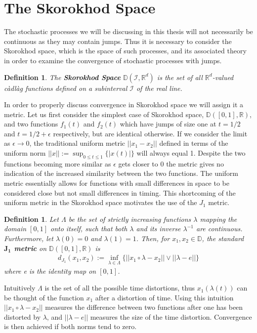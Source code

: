 \documentclass[honours,12pt,twoside, openright]{unswthesis}
\newcommand{\R}{\mathbb{R}}
\newcommand{\1}{\mathbf 1}
\newcommand{\D}{\mathbb{D}}
\newtheorem{definition}[equation]{Definition}
\numberwithin{equation}{section}
\theoremstyle{definition}
\theoremstyle{remark}
\begin{document}
\section{The Skorokhod Space}
The stochastic processes we will be discussing in this thesis will not necessarily be continuous as they may contain jumps. Thus it is necessary to consider the Skorokhod space, which is the space of such processes, and its associated theory in order to examine the convergence of stochastic processes with jumps.\\
\begin{definition}
	The \textbf{Skorokhod Space} $\D(\mathcal{I},\R^d)$ is the set of all $\R^d$-valued c\`{a}dl\`{a}g functions defined on a subinterval $\mathcal{I}$ of the real line.\\
\end{definition}

\noindent In order to properly discuss convergence in Skorokhod space we will assign it a metric. Let us first consider the simplest case of Skorokhod space, $\D([0,1],\R)$, and two functions $f_1(t)$ and $f_2(t)$ which have jumps of size one at $t=1/2$ and $t=1/2+\epsilon$ respectively, but are identical otherwise. If we consider the limit as $\epsilon\to0$, the traditional uniform metric $||x_1-x_2||$ defined in terms of the uniform norm $||x||:=\sup_{0\leq t\leq1}\{|x(t)|\}$ will always equal 1. Despite the two functions becoming more similar as $\epsilon$ gets closer to 0 the metric gives no indication of the increased similarity between the two functions. The uniform metric essentially allows for functions with small differences in space to be considered close but not small differences in timing. This shortcoming of the uniform metric in the Skorokhod space motivates the use of the $J_1$ metric.\\
\begin{definition}
	Let $\Lambda$ be the set of strictly increasing functions $\lambda$ mapping the domain $[0,1]$ onto itself, such that both $\lambda$ and its inverse $\lambda^{-1}$ are continuous. Furthermore, let $\lambda(0)=0$ and $\lambda(1)=1$. Then, for $x_1,x_2\in\D$, the standard \textbf{$\boldsymbol{J_1}$ metric} on $\D([0,1],\R)$ is 
	\begin{align*}
		d_{J_1}(x_1,x_2):=\inf_{\lambda \in \Lambda}\{||x_1 \circ \lambda -x_2||\vee||\lambda - e|| \}
	\end{align*}
	where e is the identity map on $[0,1]$.\\
\end{definition}
\noindent Intuitively $\Lambda$ is the set of all the possible time distortions, thus $x_1(\lambda(t))$ can be thought of the function $x_1$ after a distortion of time. Using this intuition $||x_1 \circ \lambda -x_2||$ measures the difference between two functions after one has been distorted by $\lambda$, and $||\lambda - e||$ measures the size of the time distortion. Convergence is then achieved if both norms tend to zero.
\end{document}
